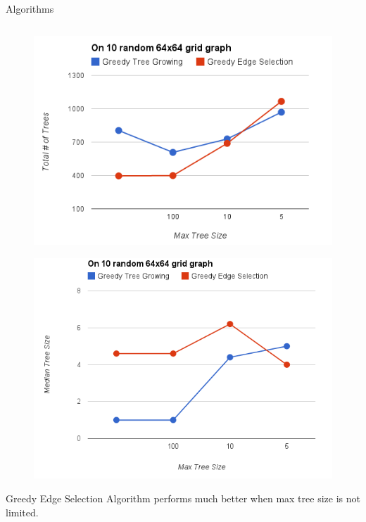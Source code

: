 \documentclass[serif,mathserif,final]{beamer}
\begin{document}
\begin{frame}{}
\begin{columns}[t]
\begin{column}{0.49\linewidth}
\begin{block}{\Huge Algorithms}
\begin{columns}[t]
\begin{column}{0.49\linewidth}
\begin{figure}
	\centering
	\includegraphics[width=\columnwidth]{TotalTrees-Vs-MaxTreeSize.png}
\end{figure}

\begin{figure}
	\centering
	\includegraphics[width=\columnwidth]{MedianTreeSize-Vs-MaxTreeSize.png}
\end{figure}

			
				{\huge
					Greedy Edge Selection Algorithm performs
					much better when max tree size is not limited. 
					\vspace{0.3in}

}
\end{column}
\end{columns}
\end{block}
\end{column}
\end{columns}
\end{frame}
\end{document}
